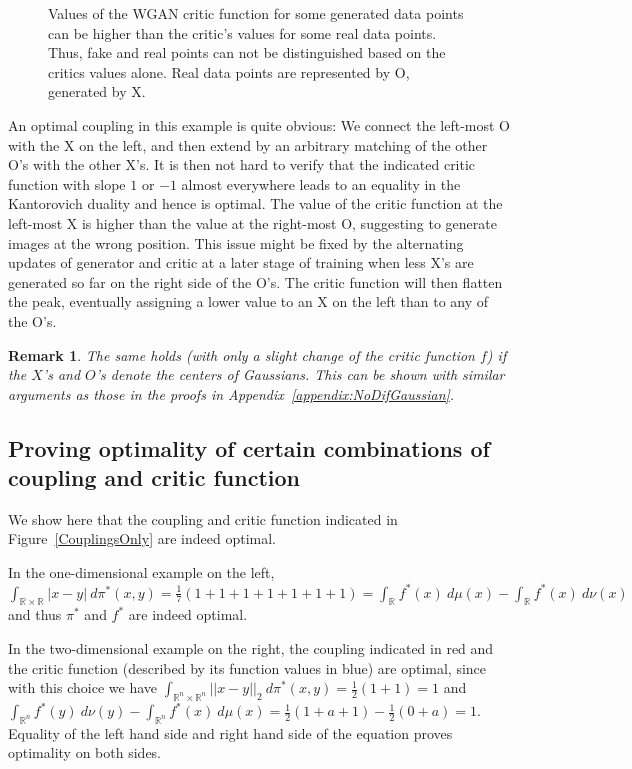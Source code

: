 \documentclass{article} %
\newcommand{\RR}[1][]{\mathbb{R}^{#1}}
\newcommand{\norm}[1]{||{#1}||_2}
\newtheorem{remark}{Remark}
\begin{document}
{\begin{figure}[H]
\begin{center}
\begin{tikzpicture}
\end{tikzpicture}
\caption{
Values of the WGAN critic function for some generated data points can be higher than the critic's values for some real data points. Thus, fake and real points can not be distinguished based on the critics values alone.
Real data points are represented by O, generated by X.}
\label{fig:criticLearnsWrong}
\end{center}
\end{figure}
%
An optimal coupling in this example is quite obvious: We connect the left-most O with the X on the left, and then extend by an arbitrary matching of the other O's with the other X's. It is then not hard to verify that the indicated critic function with slope $1$ or $-1$ almost everywhere leads to an equality in the Kantorovich duality and hence is optimal.
%
The value of the critic function at the left-most X is higher than the value at the right-most O, suggesting to generate images at the wrong position. 
%
This issue might be fixed by the alternating updates of generator and critic at a later stage of training when less X's are generated so far on the right side of the O's. The critic function will then flatten the peak, eventually assigning a lower value to an X on the left than to any of the O's.
%
\begin{remark}
The same holds (with only a slight change of the critic function $f$) if the $X$'s and $O$'s denote the centers of Gaussians. This can be shown with similar arguments as those in the proofs in Appendix~\ref{appendix:NoDifGaussian}.
\end{remark}

\subsection{Proving optimality of certain combinations of coupling and critic function}\label{sct:provingOptimality}

We show here that the coupling and critic function indicated in Figure~\ref{CouplingsOnly} are indeed optimal.

In the one-dimensional example on the left, $\int_{\RR\times\RR} |x-y|\ d\pi^*(x,y)=\frac{1}{7}(1+1+1+1+1+1+1)=\int_{\RR} f^*(x)\ d\mu(x) - \int_{\RR} f^*(x)\ d\nu(x)$ and thus $\pi^*$ and $f^*$ are indeed optimal.}

In the two-dimensional example on the right, the coupling indicated in red and the critic function (described by its function values in blue) are optimal, since with this choice we have  $\int_{\RR[n]\times\RR[n]} \norm{x-y}\ d\pi^*(x,y)=\frac{1}{2}(1+1)=1$ and $\int_{\RR[n]} f^*(y)\ d\nu(y) - \int_{\RR[n]} f^*(x)\ d\mu(x) = \frac{1}{2}(1+a+1)-\frac{1}{2}(0+a)=1.$  Equality of the left hand side and right hand side of the equation proves optimality on both sides.
\end{document}
